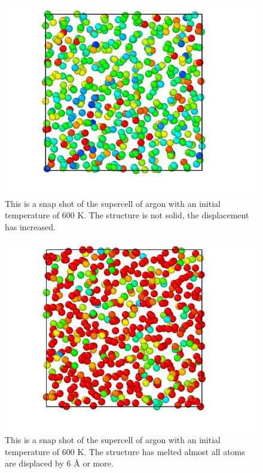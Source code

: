 \begin{multicols}{2}
\begin{figure}[H]
\includegraphics[width=\linewidth]{../figures/middle_melted_600}\caption{This is a snap shot of the supercell of argon with an initial temperature of 600 K. The structure is not solid, the displacement has increased.}\label{fig:almost_melted_600K}
\end{figure}

\begin{figure}[H]
\includegraphics[width=\linewidth]{../figures/melted_600}\caption{This is a snap shot of the supercell of argon with an initial temperature of 600 K. The structure has melted almost all atoms are displaced by 6 Å or more.}\label{fig:melted_600K}
\end{figure}

\end{multicols}

